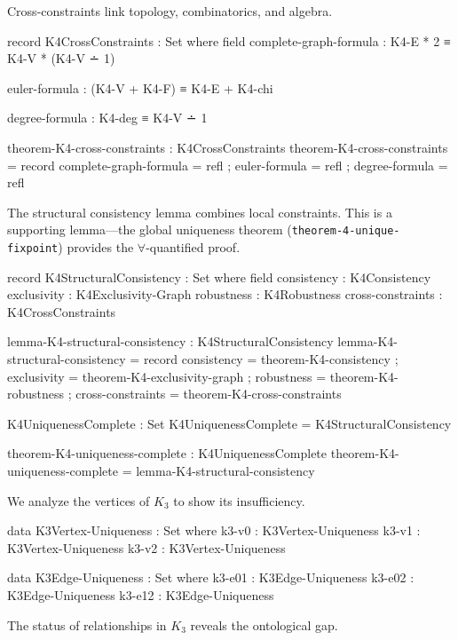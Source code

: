\documentclass[11pt,a4paper]{book}
\begin{document}
Cross-constraints link topology, combinatorics, and algebra.

\begin{code}
record K4CrossConstraints : Set where
  field
    complete-graph-formula : K4-E * 2 ≡ K4-V * (K4-V ∸ 1)
    
    euler-formula          : (K4-V + K4-F) ≡ K4-E + K4-chi
    
    degree-formula         : K4-deg ≡ K4-V ∸ 1

theorem-K4-cross-constraints : K4CrossConstraints
theorem-K4-cross-constraints = record
  { complete-graph-formula = refl
  ; euler-formula          = refl
  ; degree-formula         = refl
  }
\end{code}

The structural consistency lemma combines local constraints. This is a supporting lemma---the global uniqueness theorem (\texttt{theorem-4-unique-fixpoint}) provides the $\forall$-quantified proof.

\begin{code}
record K4StructuralConsistency : Set where
  field
    consistency       : K4Consistency
    exclusivity       : K4Exclusivity-Graph
    robustness        : K4Robustness
    cross-constraints : K4CrossConstraints

lemma-K4-structural-consistency : K4StructuralConsistency
lemma-K4-structural-consistency = record
  { consistency       = theorem-K4-consistency
  ; exclusivity       = theorem-K4-exclusivity-graph
  ; robustness        = theorem-K4-robustness
  ; cross-constraints = theorem-K4-cross-constraints
  }

K4UniquenessComplete : Set
K4UniquenessComplete = K4StructuralConsistency

theorem-K4-uniqueness-complete : K4UniquenessComplete
theorem-K4-uniqueness-complete = lemma-K4-structural-consistency
\end{code}

We analyze the vertices of $K_3$ to show its insufficiency.

\begin{code}
data K3Vertex-Uniqueness : Set where
  k3-v0 : K3Vertex-Uniqueness
  k3-v1 : K3Vertex-Uniqueness
  k3-v2 : K3Vertex-Uniqueness

data K3Edge-Uniqueness : Set where
  k3-e01 : K3Edge-Uniqueness
  k3-e02 : K3Edge-Uniqueness
  k3-e12 : K3Edge-Uniqueness
\end{code}

The status of relationships in $K_3$ reveals the ontological gap.
\end{document}
